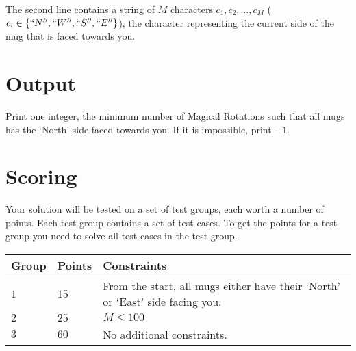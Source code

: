 The second line contains a string of $M$ characters $c_1, c_2, \dots, c_M$ ($c_i \in \{``N'',``W'',``S'',``E''\}$), the character representing the current side of the mug that is faced towards you.

\section*{Output}
Print one integer, the minimum number of Magical Rotations such that all mugs has the `North' side faced towards you. If it is impossible, print $-1$. 

\section*{Scoring}
Your solution will be tested on a set of test groups, each worth a number of points. Each test group contains
a set of test cases. To get the points for a test group you need to solve all test cases in the test group.

\noindent
\begin{tabular}{| l | l | p{12cm} |}
  \hline
  \textbf{Group} & \textbf{Points} & \textbf{Constraints} \\ \hline
  $1$    & $15$       & From the start, all mugs either have their `North' or `East' side facing you. \\ \hline
  $2$    & $25$       & $M \leq 100$ \\ \hline
  $3$    & $60$       & No additional constraints. \\ \hline
\end{tabular}